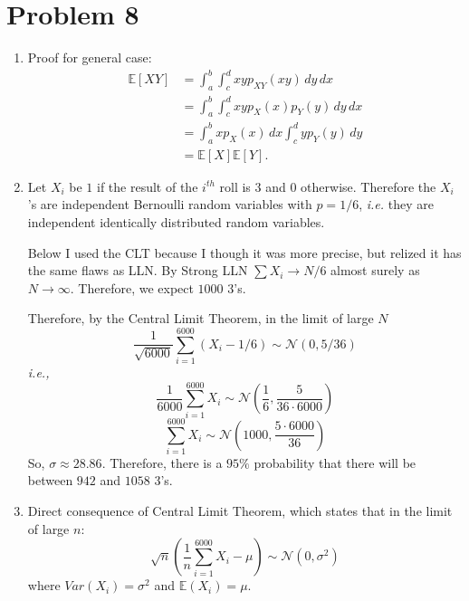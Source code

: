 \documentclass[11pt]{article}
\begin{document}
\section{Problem 8}
\begin{enumerate}
\item
Proof for general case:
\begin{align*}
  \mathbb{E}[XY] &= \int_a^b\int_c^d xyp_{XY}(xy)\,dy \,dx\\
  &= \int_a^b\int_c^d xyp_{X}(x)p_Y(y)\,dy \,dx\\
  &= \int_a^b xp_{X}(x) \,dx \int_c^d yp_{Y}(y) \,dy\\
  &= \mathbb{E}[X] \mathbb{E}[Y].
\end{align*}
\item
  
  Let $X_i$ be $1$ if the result of the $i^{th}$ roll is $3$ and $0$ otherwise.
  Therefore the $X_i$'s are independent Bernoulli random variables with
  $p=1/6$, \textit{i.e.} they are independent identically distributed random
  variables.
  
  Below I used the CLT because I though it was more precise, but relized it has
  the same flaws as LLN. By Strong LLN $\sum X_i \rightarrow N/6$ almost surely
  as $N \rightarrow \infty$. Therefore, we expect $1000$ $3$'s.

  Therefore, by the Central Limit Theorem, in the limit of large $N$
  \[\frac{1}{\sqrt{6000}} \sum_{i=1}^{6000} (X_i - 1/6) \sim \mathcal{N}(0, 5/36)\]
  \textit{i.e.,}
  \[\frac{1}{6000}\sum_{i=1}^{6000} X_i \sim \mathcal{N}\left(\frac{1}{6}, \frac{5}{36\cdot 6000}\right)\]
  \[\sum_{i=1}^{6000} X_i \sim \mathcal{N}\left(1000, \frac{5 \cdot 6000}{36}\right)\]  
So, $\sigma \approx 28.86$. Therefore, there is a $95\%$ probability that there
will be between $942$ and $1058$ $3$'s.
\item
  Direct consequence of Central Limit Theorem, which states that in the limit
  of large $n$:
  \[\sqrt{n} \left(\frac{1}{n}\sum_{i=1}^{6000} X_i - \mu\right) \sim \mathcal{N}(0, \sigma^2)\]
  where $Var(X_i) = \sigma^2$ and $\mathbb{E}(X_i) = \mu$.
\end{enumerate}
\newpage
\end{document}
